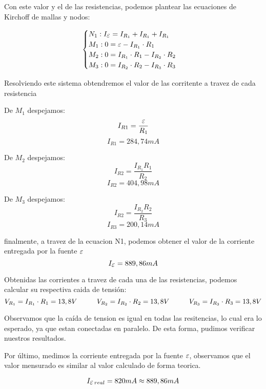 \documentclass[12pt]{report}
\newcommand {\LEpsilon}{\mathlarger\varepsilon}
\begin{document}
Con este valor y el de las resistencias, podemos plantear las ecuaciones de Kirchoff de mallas y
nodos:

\[
\begin{cases}
  N_1 : I_{\LEpsilon} = I_{R_1} + I_{R_1} + I_{R_1} \\
  M_1 : 0 = \LEpsilon - I_{R_1} \cdot R_1 \\
  M_2 : 0 = I_{R_1} \cdot R_1 - I_{R_2} \cdot R_2 \\
  M_3 : 0 = I_{R_2} \cdot R_2 - I_{R_3} \cdot R_3
\end{cases}
\]

Resolviendo este sistema obtendremos el valor de las corritente a travez de cada resistencia

\noindent
\begin{minipage}[t]{0.33\textwidth}
  \centering
  De $M_1$ despejamos:
  $$I_{R1} = \frac{\LEpsilon}{R_1}$$
  $$I_{R1} = 284,74 mA $$
\end{minipage}
\begin{minipage}[t]{0.33\textwidth}
  \centering
  De $M_2$ despejamos:
  $$I_{R2} = \frac{I_{R_1}R_1}{R_2} $$
  $$I_{R2} = 404,98 mA $$
\end{minipage}
\begin{minipage}[t]{0.33\textwidth}
  \centering
  De $M_3$ despejamos:
  $$I_{R2} = \frac{I_{R_2}R_2}{R_3} $$
  $$I_{R3} = 200,14 mA $$
\end{minipage}

\vspace{7mm}

finalmente, a travez de la ecuacion N1, podemos obtener el valor de la corriente entregada 
por la fuente $\LEpsilon$
$$I_{\LEpsilon} = 889,86 mA$$

Obtenidas las corrientes a travez de cada una de las resistencias, podemos calcular su respectiva
caida de tensión:
$$ V_{R_1} = I_{R_1} \cdot R_1 = 13,8V \hspace{10mm} V_{R_2} = I_{R_2} \cdot R_2 = 13,8V 
\hspace{10mm} V_{R_3} = I_{R_3} \cdot R_3 = 13,8V $$

Observamos que la caída de tension es igual en todas las resitencias, lo cual era lo esperado, ya
que estan conectadas en paralelo. De esta forma, pudimos verificar nuestros resultados.

Por último, medimos la corriente entregada por la fuente $\LEpsilon$, observamos que el
valor mensurado es similar al valor calculado de forma teorica.

$$ I_{\LEpsilon \hspace{0,5mm} real} = 820mA \approx 889,86 mA $$
\end{document}
